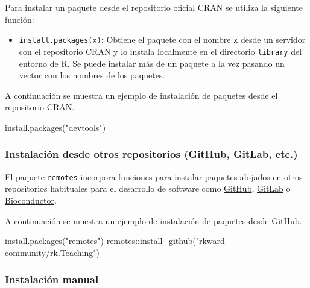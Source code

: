 \documentclass[
]{book}
\newenvironment{Shaded}{\begin{snugshade}}{\end{snugshade}}
\newcommand{\FunctionTok}[1]{\textcolor[rgb]{0.00,0.00,0.00}{#1}}
\newcommand{\NormalTok}[1]{#1}
\newcommand{\SpecialCharTok}[1]{\textcolor[rgb]{0.00,0.00,0.00}{#1}}
\newcommand{\StringTok}[1]{\textcolor[rgb]{0.31,0.60,0.02}{#1}}
\providecommand{\tightlist}{%
  \setlength{\itemsep}{0pt}\setlength{\parskip}{0pt}}
\theoremstyle{definition}
\theoremstyle{definition}
\theoremstyle{definition}
\theoremstyle{definition}
\theoremstyle{remark}
\begin{document}
Para instalar un paquete desde el repositorio oficial CRAN se utiliza la siguiente función:

\begin{itemize}
\tightlist
\item
  \texttt{install.packages(x)}: Obtiene el paquete con el nombre \texttt{x} desde un servidor con el repositorio CRAN y lo instala localmente en el directorio \texttt{library} del entorno de R. Se puede instalar más de un paquete a la vez pasando un vector con los nombres de los paquetes.
\end{itemize}

A continuación se muestra un ejemplo de instalación de paquetes desde el repositorio CRAN.

\begin{Shaded}
\begin{Highlighting}[]
\FunctionTok{install.packages}\NormalTok{(}\StringTok{"devtools"}\NormalTok{)}
\end{Highlighting}
\end{Shaded}

\hypertarget{instalaciuxf3n-desde-otros-repositorios-github-gitlab-etc.}{%
\subsubsection{Instalación desde otros repositorios (GitHub, GitLab, etc.)}\label{instalaciuxf3n-desde-otros-repositorios-github-gitlab-etc.}}

El paquete \texttt{remotes} incorpora funciones para instalar paquetes alojados en otros repositorios habituales para el desarrollo de software como \href{https://github.com/}{GitHub}, \href{httpsb://gitlab.com/}{GitLab} o \href{https://www.bioconductor.org/}{Bioconductor}.

A continuación se muestra un ejemplo de instalación de paquetes desde GitHub.

\begin{Shaded}
\begin{Highlighting}[]
\FunctionTok{install.packages}\NormalTok{(}\StringTok{"remotes"}\NormalTok{)}
\NormalTok{remotes}\SpecialCharTok{::}\FunctionTok{install\_github}\NormalTok{(}\StringTok{"rkward{-}community/rk.Teaching"}\NormalTok{)}
\end{Highlighting}
\end{Shaded}

\hypertarget{instalaciuxf3n-manual}{%
\subsubsection{Instalación manual}\label{instalaciuxf3n-manual}}
\end{document}
